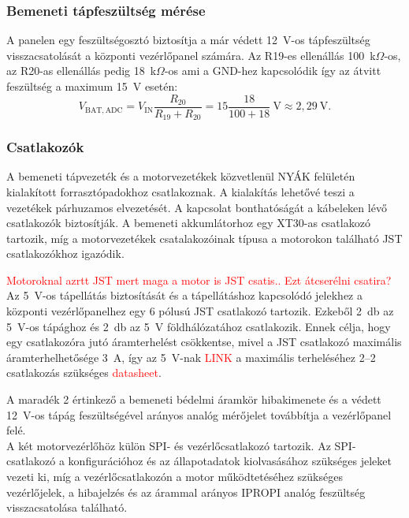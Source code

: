 \subsubsection{Bemeneti tápfeszültség mérése}

A panelen egy feszültségosztó biztosítja a már védett 12~V-os tápfeszültség visszacsatolását a központi vezérlőpanel számára.
Az R19-es ellenállás 100~k$\Omega$-os, az R20-as ellenállás pedig 18~k$\Omega$-os ami a GND-hez kapcsolódik
így az átvitt feszültség a maximum 15~V esetén:
\begin{equation}
    V_{\mathrm{BAT,ADC}}=V_{\mathrm{IN}}\frac{R_{20}}{R_{19}+R_{20}}
    =15\frac{18}{100+18}~\mathrm{V}
    \approx2{,}29~\mathrm{V}.
    \label{eq:vedelem-feszultseg-osztas}
\end{equation}

\subsubsection{Csatlakozók}
A bemeneti tápvezeték és a motorvezetékek közvetlenül 
NYÁK felületén kialakított forrasztópadokhoz csatlakoznak. A kialakítás
lehetővé teszi a vezetékek párhuzamos elvezetését. A kapcsolat bonthatóságát
a kábeleken lévő csatlakozók biztosítják. A bemeneti akkumlátorhoz egy XT30-as 
csatlakozó tartozik, míg a motorvezetékek csatalakozóinak 
típusa a motorokon található JST csatlakozókhoz igazódik.

\textcolor{red}{Motoroknal azrtt JST mert maga a motor is JST csatis..}
\textcolor{red}{Ezt átcserélni csatira?} \\

Az 5~V-os tápellátás biztosítását és a tápellátáshoz kapcsolódó jelekhez a központi vezérlőpanelhez egy 6 pólusú
JST csatlakozó tartozik. Ezkeből 2~db az 5~V-os tápághoz és 2~db az 5~V földhálózatához 
csatlakozik. Ennek célja, hogy egy csatlakozóra jutó áramterhelést csökkentse, mivel a JST
csatlakozó maximális áramterhelhetősége 3~A, így az 5~V-nak \textcolor{red}{LINK} a maximális terheléséhez 2--2 csatlakozás
szükséges \textcolor{red}{datasheet}. 

A maradék 2 értinkező a bemeneti bédelmi áramkör hibakimenete és a védett 12~V-os tápág 
feszültségével arányos analóg mérőjelet továbbítja a vezérlőpanel felé. \\

A két motorvezérlőhöz külön SPI- és vezérlőcsatlakozó tartozik.
Az SPI-csatlakozó a konfigurációhoz és az állapotadatok
kiolvasásához szükséges jeleket vezeti ki, míg a  vezérlőcsatlakozón a motor működtetéséhez szükséges
vezérlőjelek, a hibajelzés és az árammal arányos IPROPI analóg 
feszültség visszacsatolása található.

